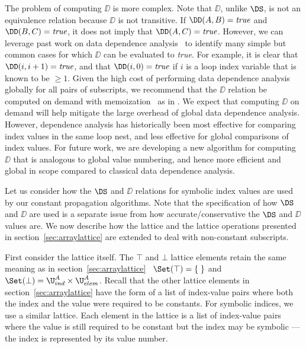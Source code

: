The problem of computing
$\DD$ is more complex. Note that $\DD$, unlike $\DS$, is not an
equivalence relation because $\DD$ is not transitive.
If $\DD(A, B)=\mbox{\it true}$
and $\DD(B, C)=\mbox{\it true}$, it does
not imply that $\DD(A, C)=\mbox{\it true}$.  
However, we can leverage past work on data dependence analysis~\cite{Wolf89}
to identify many simple but common cases for which $\DD$ can be
evaluated to {\it true}.  For example, it is clear that $\DD(i,
i+1) = \mbox{\it true}$,
and that $\DD(i, 0) = \mbox{\it true}$ if $i$ is a loop index variable
that is known to be $\geq 1$.
Given the high cost of performing data dependence analysis globally for all pairs of subscripts, we recommend that the $\DD$ relation be computed on demand
with memoization \eg\ as in \cite{MaAL93}.
We expect that computing $\DD$ on demand will help
mitigate the large overhead of global data dependence analysis.
However, dependence analysis has historically been most effective for comparing index values in the same loop nest, and less effective
for global comparisons of index values.
For future work, we are developing a new algorithm for computing
$\DD$ that is analogous to global value numbering,
and hence more efficient and global in scope compared to classical
data dependence
analysis.

Let us consider how the $\DS$ and $\DD$ relations for 
symbolic index values
are used by our constant
propagation algorithms.  Note that the specification of how $\DS$ and $\DD$
are used is a separate issue from how accurate/conservative
the $\DS$ and $\DD$ values are.
We now describe how 
the lattice and the lattice operations presented in
section~\ref{sec:arraylattice} are extended
to deal with non-constant subscripts.

First consider the lattice itself. 
The 
$\top$ and $\bot$ lattice elements retain
the same meaning as in section~\ref{sec:arraylattice}
\viz\ $\Set(\top) = \{\;\}$ and 
$\Set(\bot) =  \U^A_{ind} \times \U^A_{elem}$.
Recall that
the other lattice elements in section~\ref{sec:arraylattice}
have the form of a list of index-value pairs
where both the index and the value were required to be constants. 
For
symbolic indices, we use a similar lattice.  Each element in the lattice is a list
of index-value pairs where the value is still required to
be constant but the index may be symbolic --- the index is
represented by its value number.

